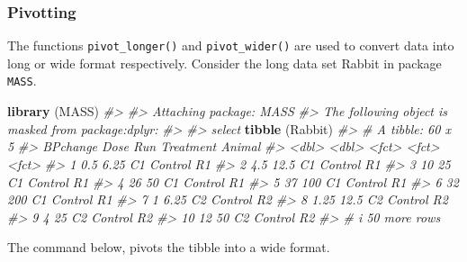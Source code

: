 \documentclass[
]{book}
\newenvironment{Shaded}{\begin{snugshade}}{\end{snugshade}}
\newcommand{\CommentTok}[1]{\textcolor[rgb]{0.56,0.35,0.01}{\textit{#1}}}
\newcommand{\FunctionTok}[1]{\textcolor[rgb]{0.13,0.29,0.53}{\textbf{#1}}}
\newcommand{\NormalTok}[1]{#1}
\begin{document}
\subsubsection{Pivotting}\label{pivotting}

The functions \texttt{pivot\_longer()} and \texttt{pivot\_wider()} are used to convert data into long or wide format respectively. Consider the long data set Rabbit in package \texttt{MASS}.

\begin{Shaded}
\begin{Highlighting}[]
\FunctionTok{library}\NormalTok{ (MASS)}
\CommentTok{\#\textgreater{} }
\CommentTok{\#\textgreater{} Attaching package: \textquotesingle{}MASS\textquotesingle{}}
\CommentTok{\#\textgreater{} The following object is masked from \textquotesingle{}package:dplyr\textquotesingle{}:}
\CommentTok{\#\textgreater{} }
\CommentTok{\#\textgreater{}     select}
\FunctionTok{tibble}\NormalTok{ (Rabbit)}
\CommentTok{\#\textgreater{} \# A tibble: 60 x 5}
\CommentTok{\#\textgreater{}    BPchange   Dose Run   Treatment Animal}
\CommentTok{\#\textgreater{}       \textless{}dbl\textgreater{}  \textless{}dbl\textgreater{} \textless{}fct\textgreater{} \textless{}fct\textgreater{}     \textless{}fct\textgreater{} }
\CommentTok{\#\textgreater{}  1     0.5    6.25 C1    Control   R1    }
\CommentTok{\#\textgreater{}  2     4.5   12.5  C1    Control   R1    }
\CommentTok{\#\textgreater{}  3    10     25    C1    Control   R1    }
\CommentTok{\#\textgreater{}  4    26     50    C1    Control   R1    }
\CommentTok{\#\textgreater{}  5    37    100    C1    Control   R1    }
\CommentTok{\#\textgreater{}  6    32    200    C1    Control   R1    }
\CommentTok{\#\textgreater{}  7     1      6.25 C2    Control   R2    }
\CommentTok{\#\textgreater{}  8     1.25  12.5  C2    Control   R2    }
\CommentTok{\#\textgreater{}  9     4     25    C2    Control   R2    }
\CommentTok{\#\textgreater{} 10    12     50    C2    Control   R2    }
\CommentTok{\#\textgreater{} \# i 50 more rows}
\end{Highlighting}
\end{Shaded}

The command below, pivots the tibble into a wide format.
\end{document}
